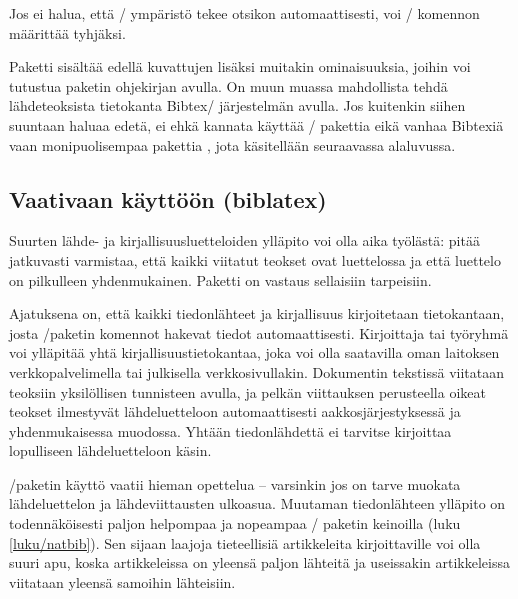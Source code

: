 Jos ei halua, että \-/ ympäristö tekee
otsikon automaattisesti, voi \-/ komennon määrittää
tyhjäksi.

\begin{koodilohkosis}
\renewcommand{\bibsection}{}
\end{koodilohkosis}

\noindent
Paketti  sisältää edellä kuvattujen lisäksi muitakin
ominaisuuksia, joihin voi tutustua paketin ohjekirjan avulla. On muun
muassa mahdollista tehdä lähdeteoksista tietokanta Bibtex\-/
järjestelmän avulla. Jos kuitenkin siihen suuntaan haluaa edetä, ei ehkä
kannata käyttää \-/ pakettia eikä vanhaa Bibtexiä vaan
monipuolisempaa pakettia , jota käsitellään
seuraavassa alaluvussa.

\subsection{Vaativaan käyttöön (biblatex)}
\label{luku/biblatex}

Suurten lähde- ja kirjallisuusluetteloiden ylläpito voi olla aika
työlästä: pitää jatkuvasti varmistaa, että kaikki viitatut teokset ovat
luettelossa ja että luettelo on pilkulleen yhdenmukainen. Paketti
 on vastaus sellaisiin tarpeisiin.

Ajatuksena on, että kaikki tiedonlähteet ja kirjallisuus kirjoitetaan
tietokantaan, josta \-/paketin komennot hakevat tiedot
automaattisesti. Kirjoittaja tai työryhmä voi ylläpitää yhtä
kirjallisuustietokantaa, joka voi olla saatavilla oman laitoksen
verkkopalvelimella tai julkisella verkkosivullakin. Dokumentin tekstissä
viitataan teoksiin yksilöllisen tunnisteen avulla, ja pelkän viittauksen
perusteella oikeat teokset ilmestyvät lähdeluetteloon automaattisesti
aakkosjärjestyksessä ja yhdenmukaisessa muodossa. Yhtään tiedonlähdettä
ei tarvitse kirjoittaa lopulliseen lähdeluetteloon käsin.

\-/paketin käyttö vaatii hieman opettelua -- varsinkin
jos on tarve muokata lähdeluettelon ja lähdeviittausten ulkoasua.
Muutaman tiedonlähteen ylläpito on todennäköisesti paljon helpompaa ja
nopeampaa \-/ paketin keinoilla (luku
\ref{luku/natbib}). Sen sijaan laajoja tieteellisiä artikkeleita
kirjoittaville  voi olla suuri apu, koska
artikkeleissa on yleensä paljon lähteitä ja useissakin artikkeleissa
viitataan yleensä samoihin lähteisiin.

